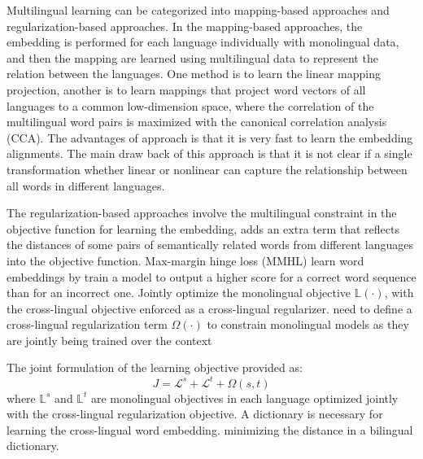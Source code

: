 Multilingual learning can be categorized into mapping-based approaches and regularization-based approaches. In the mapping-based approaches, the embedding is performed for each language individually with monolingual data, and then the mapping are learned using multilingual data to represent the relation between the languages. One method is to learn the linear mapping projection, another is to learn mappings that project word vectors of all languages to a common low-dimension space, where the correlation of the multilingual word pairs is maximized with the canonical correlation analysis (CCA). The advantages of approach is that it is very fast to learn the embedding alignments. The main draw back of this approach is that it is not clear if a single transformation whether linear or nonlinear can capture the relationship between all words in different languages.

The regularization-based approaches involve the multilingual constraint in the objective function for learning the embedding, adds an extra term that reflects the distances of some pairs of semantically related words from different languages into the objective function. 
Max-margin hinge loss (MMHL)
learn word embeddings by train a model to output a higher score for a correct word sequence than for an incorrect one. 
Jointly optimize the monolingual objective ${\mathbb{L(\cdot)}}$, with the cross-lingual objective enforced as a cross-lingual regularizer. need to define a cross-lingual regularization term ${\Omega(\cdot)}$ to constrain monolingual models as they are jointly being trained over the context

The joint formulation of the learning objective provided as:
\[ J = \mathcal{L}^s + \mathcal{L}^t + \Omega(s,t) \]
where ${\mathbb{L}^s}$ and ${\mathbb{L}^t}$ are monolingual objectives in each language optimized jointly with the cross-lingual regularization objective. 
A dictionary is necessary for learning the cross-lingual word embedding. 
minimizing the distance in a bilingual dictionary.\\

